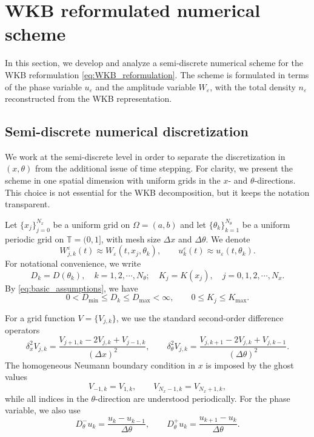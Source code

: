 \documentclass[11pt]{article}
\begin{document}
\section{WKB reformulated numerical scheme}\label{sec:WKB_scheme}

In this section, we develop and analyze a semi-discrete numerical scheme for
the WKB reformulation \eqref{eq:WKB_reformulation}. The scheme is formulated
in terms of the phase variable \(u_\varepsilon\) and the amplitude variable
\(W_\varepsilon\), with the total density \(n_\varepsilon\) reconstructed from
the WKB representation.

\subsection{Semi-discrete numerical discretization}

We work at the semi-discrete level in order to separate the discretization in
\((x,\theta)\) from the additional issue of time stepping. For clarity, we
present the scheme in one spatial dimension with uniform grids in the
\(x\)- and \(\theta\)-directions. This choice is not essential for the WKB
decomposition, but it keeps the notation transparent.

Let \(\{x_j\}_{j=0}^{N_x}\) be a uniform grid on \(\Omega=(a,b)\) and let
\(\{\theta_k\}_{k=1}^{N_\theta}\) be a uniform periodic grid on \(\mathbb T=(0,1]\),
with mesh size $\Delta x$ and \(\Delta\theta\). We denote
\[
W_{j,k}^\varepsilon(t)\approx W_\varepsilon(t,x_j,\theta_k),
\qquad
u_k^\varepsilon(t)\approx u_\varepsilon(t,\theta_k).
\]
For notational convenience, we write
\[
D_k=D(\theta_k), \quad k = 1,2,\cdots, N_\theta;
\quad
K_j=K(x_j), \quad j=0, 1,2,\cdots, N_x. 
\] 
By \eqref{eq:basic_assumptions}, we have 
\[
    0<D_{\min}\le D_k\le D_{\max}<\infty,
    \qquad
    0\le K_j\le K_{\max}.
\]


For a grid function \(V=\{V_{j,k}\}\), we use the standard second-order
difference operators
\[
\delta_x^2 V_{j,k}
=
\frac{V_{j+1,k}-2V_{j,k}+V_{j-1,k}}{(\Delta x)^2},
\qquad
\delta_\theta^2 V_{j,k}
=
\frac{V_{j,k+1}-2V_{j,k}+V_{j,k-1}}{(\Delta\theta)^2}.
\]
The homogeneous Neumann boundary condition in \(x\) is imposed by the ghost
values
\[
V_{-1,k}=V_{1,k},
\qquad
V_{N_x-1,k}=V_{N_x+1,k},
\]
while all indices in the \(\theta\)-direction are understood periodically.
For the phase variable, we also use
\[
D_\theta^-u_k
=
\frac{u_k-u_{k-1}}{\Delta\theta},
\qquad
D_\theta^+u_k
=
\frac{u_{k+1}-u_k}{\Delta\theta}.
\]
\end{document}
